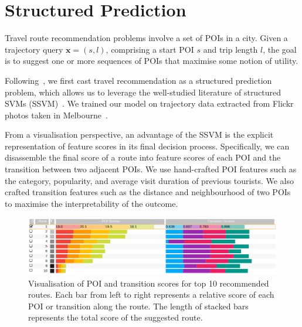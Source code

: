 \section{Structured Prediction}
Travel route recommendation problems involve a set of POIs in a city. 
Given a trajectory query $\mathbf{x} = (s, l)$, comprising a start POI $s$ and trip length $l$, the goal is to suggest one or more sequences of POIs that maximise some notion of utility.

Following~\cite{chen2017SR}, we first cast travel recommendation as a structured prediction problem, which allows us to leverage the well-studied literature of structured SVMs (SSVM)~\cite{joachims2009predicting}. 
We trained our model on trajectory data extracted from Flickr photos taken in Melbourne~\cite{chen2016learning}.

From a visualisation perspective, an advantage of the SSVM is the explicit representation of feature scores in its final decision process. Specifically, we can disassemble the final score of a route into feature scores of each POI and the transition between two adjacent POIs. 
We use hand-crafted POI features such as the category, popularity, and average visit duration of previous tourists. We also crafted transition features such as the distance and neighbourhood of two POIs to maximise the interpretability of the outcome.

\begin{figure}[t!]
\includegraphics[width=\linewidth]{figure/sample_stack.png}
\caption{Visualisation of POI and transition scores for top 10 recommended routes. Each bar from left to right represents a relative score of each POI or transition along the route.
The length of stacked bars represents the total score of the suggested route.}
\label{fig:stack} \vspace{-2em}
\end{figure}
